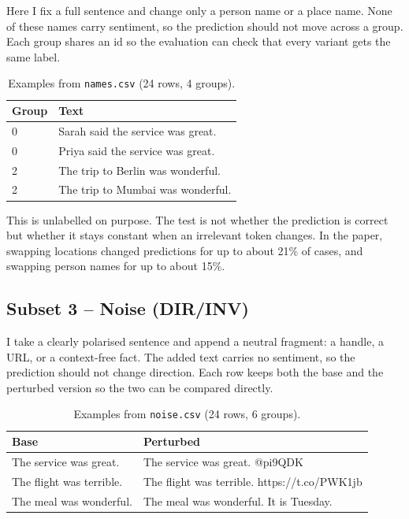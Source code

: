 \documentclass[11pt]{article}
\begin{document}
Here I fix a full sentence and change only a person name or a place name.
None of these names carry sentiment, so the prediction should not move across
a group. Each group shares an id so the evaluation can check that every
variant gets the same label.

\begin{table}[h]
\centering
\begin{tabular}{ll}
\toprule
Group & Text \\
\midrule
0 & Sarah said the service was great. \\
0 & Priya said the service was great. \\
2 & The trip to Berlin was wonderful. \\
2 & The trip to Mumbai was wonderful. \\
\bottomrule
\end{tabular}
\caption{Examples from \texttt{names.csv} (24 rows, 4 groups).}
\end{table}

This is unlabelled on purpose. The test is not whether the prediction is
correct but whether it stays constant when an irrelevant token changes. In
the paper, swapping locations changed predictions for up to about 21\% of
cases, and swapping person names for up to about 15\%.

\subsection{Subset 3 -- Noise (DIR/INV)}

I take a clearly polarised sentence and append a neutral fragment: a handle,
a URL, or a context-free fact. The added text carries no sentiment, so the
prediction should not change direction. Each row keeps both the base and the
perturbed version so the two can be compared directly.

\begin{table}[h]
\centering
\begin{tabular}{ll}
\toprule
Base & Perturbed \\
\midrule
The service was great. & The service was great. @pi9QDK \\
The flight was terrible. & The flight was terrible. https://t.co/PWK1jb \\
The meal was wonderful. & The meal was wonderful. It is Tuesday. \\
\bottomrule
\end{tabular}
\caption{Examples from \texttt{noise.csv} (24 rows, 6 groups).}
\end{table}
\end{document}
